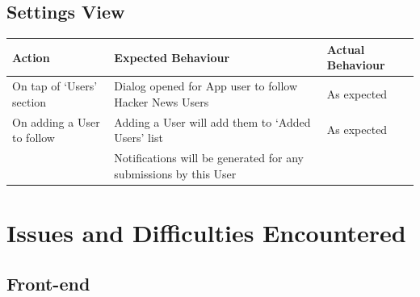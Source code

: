 \documentclass[11pt]{article}
\begin{document}
\subsection*{Settings View}
\begin{center}
\begin{tabular}{ | p{5cm} | p{5cm} | p{5cm} |}
	\hline
	\textbf{Action} & \textbf{Expected Behaviour} & \textbf{Actual Behaviour} \\
	\hline	
	On tap of ‘Users’ section & Dialog opened for App user to follow Hacker News Users & As expected \\
	\hline
	On adding a User to follow & Adding a User will add them to ‘Added Users’ list & As expected \\ & Notifications will be generated for any submissions by this User & \\
	\hline
\end{tabular}
\end{center}

\section*{Issues and Difficulties Encountered}

\subsection*{Front-end}
\end{document}
